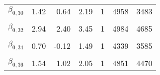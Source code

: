 \begin{table}
\begin{tabular}[t]{lrrrrrr}
$\beta_{0, 30}$ & 1.42 & 0.64 & 2.19 & 1 & 4958 & 3483\\
\cellcolor{gray!6}{$\beta_{0, 31}$} & \cellcolor{gray!6}{2.35} & \cellcolor{gray!6}{1.70} & \cellcolor{gray!6}{3.00} & \cellcolor{gray!6}{1} & \cellcolor{gray!6}{5026} & \cellcolor{gray!6}{4321}\\
$\beta_{0, 32}$ & 2.94 & 2.40 & 3.45 & 1 & 4984 & 4685\\
\cellcolor{gray!6}{$\beta_{0, 33}$} & \cellcolor{gray!6}{0.63} & \cellcolor{gray!6}{0.06} & \cellcolor{gray!6}{1.21} & \cellcolor{gray!6}{1} & \cellcolor{gray!6}{4850} & \cellcolor{gray!6}{3684}\\
$\beta_{0, 34}$ & 0.70 & -0.12 & 1.49 & 1 & 4339 & 3585\\
\cellcolor{gray!6}{$\beta_{0, 35}$} & \cellcolor{gray!6}{4.16} & \cellcolor{gray!6}{3.63} & \cellcolor{gray!6}{4.70} & \cellcolor{gray!6}{1} & \cellcolor{gray!6}{4794} & \cellcolor{gray!6}{3714}\\
$\beta_{0, 36}$ & 1.54 & 1.02 & 2.05 & 1 & 4851 & 4470\\
\bottomrule
\end{tabular}
\end{table}